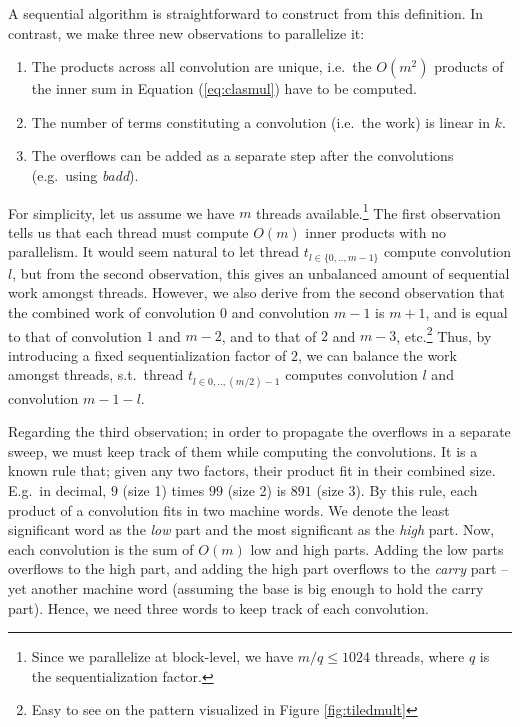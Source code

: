A sequential algorithm is straightforward to construct from this definition. In
contrast, we make three new observations to parallelize it:
\begin{enumerate}[label=--]
\item The products across all convolution are unique, i.e.\ the $O(m^2)$
  products of the inner sum in Equation (\ref{eq:clasmul}) have to be computed.
\item The number of terms constituting a convolution (i.e.\ the work) is linear
  in $k$.
\item The overflows can be added as a separate step after the convolutions
  (e.g.\ using \textit{badd}).
\end{enumerate}

For simplicity, let us assume we have $m$ threads available.\footnote{Since we
  parallelize at block-level, we have $m/q \leq 1024$ threads, where $q$ is the
  sequentialization factor.} The first observation tells us that each thread
must compute $O(m)$ inner products with no parallelism. It would seem natural to
let thread $t_{l\in\{0,..,m-1\}}$ compute convolution $l$, but from the second
observation, this gives an unbalanced amount of sequential work amongst
threads. However, we also derive from the second observation that the combined
work of convolution $0$ and convolution ${m-1}$ is $m+1$, and is equal to that
of convolution $1$ and ${m-2}$, and to that of $2$ and ${m-3}$,
etc.\footnote{Easy to see on the pattern visualized in Figure
  \ref{fig:tiledmult}} Thus, by introducing a fixed sequentialization factor of
$2$, we can balance the work amongst threads, s.t.\ thread
$t_{l\in 0,..,(m/2)-1}$ computes convolution $l$ and convolution $m-1-l$.

Regarding the third observation; in order to propagate the overflows in a
separate sweep, we must keep track of them while computing the convolutions. It
is a known rule that; given any two factors, their product fit in their combined
size. E.g.\ in decimal, $9$ (size 1) times $99$ (size 2) is $891$ (size 3). By
this rule, each product of a convolution fits in two machine words. We denote
the least significant word as the \textit{low} part and the most significant as
the \textit{high} part. Now, each convolution is the sum of $O(m)$ low and high
parts. Adding the low parts overflows to the high part, and adding the high part
overflows to the \textit{carry} part -- yet another machine word (assuming the
base is big enough to hold the carry part). Hence, we need three words to keep
track of each convolution.

